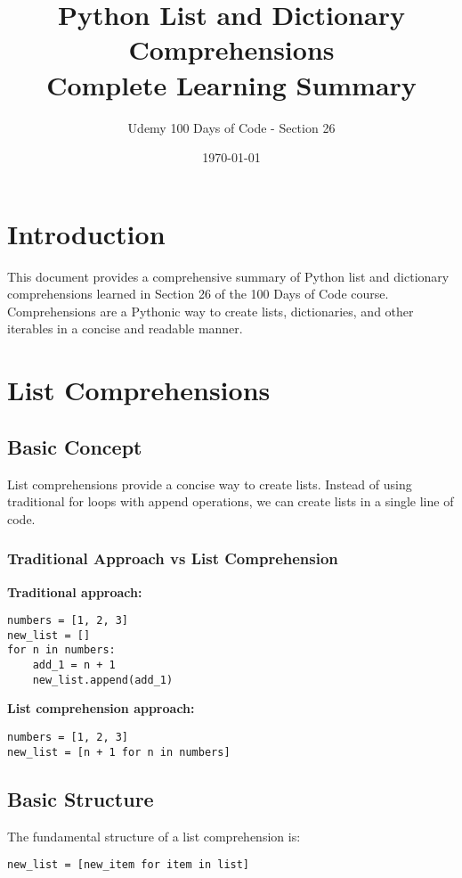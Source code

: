 \documentclass[12pt,a4paper]{article}
\title{\textbf{Python List and Dictionary Comprehensions\\Complete Learning Summary}}
\author{Udemy 100 Days of Code - Section 26}
\date{\today}
\begin{document}
\maketitle
\tableofcontents
\newpage

\section{Introduction}

This document provides a comprehensive summary of Python list and dictionary comprehensions learned in Section 26 of the 100 Days of Code course. Comprehensions are a Pythonic way to create lists, dictionaries, and other iterables in a concise and readable manner.

\section{List Comprehensions}

\subsection{Basic Concept}

List comprehensions provide a concise way to create lists. Instead of using traditional for loops with append operations, we can create lists in a single line of code.

\subsubsection{Traditional Approach vs List Comprehension}

\textbf{Traditional approach:}
\begin{lstlisting}
numbers = [1, 2, 3]
new_list = []
for n in numbers:
    add_1 = n + 1
    new_list.append(add_1)
\end{lstlisting}

\textbf{List comprehension approach:}
\begin{lstlisting}
numbers = [1, 2, 3]
new_list = [n + 1 for n in numbers]
\end{lstlisting}

\subsection{Basic Structure}

The fundamental structure of a list comprehension is:
\begin{center}
\texttt{new\_list = [new\_item for item in list]}
\end{center}
\end{document}

